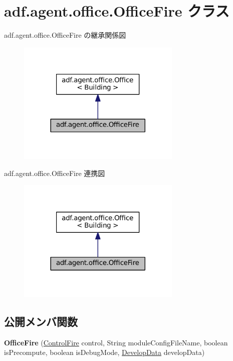 \hypertarget{classadf_1_1agent_1_1office_1_1OfficeFire}{}\section{adf.\+agent.\+office.\+Office\+Fire クラス}
\label{classadf_1_1agent_1_1office_1_1OfficeFire}


adf.\+agent.\+office.\+Office\+Fire の継承関係図
\nopagebreak
\begin{figure}[H]
\begin{center}
\leavevmode
\includegraphics[width=221pt]{classadf_1_1agent_1_1office_1_1OfficeFire__inherit__graph}
\end{center}
\end{figure}


adf.\+agent.\+office.\+Office\+Fire 連携図
\nopagebreak
\begin{figure}[H]
\begin{center}
\leavevmode
\includegraphics[width=221pt]{classadf_1_1agent_1_1office_1_1OfficeFire__coll__graph}
\end{center}
\end{figure}
\subsection*{公開メンバ関数}
\begin{DoxyCompactItemize}
\item 
\hypertarget{classadf_1_1agent_1_1office_1_1OfficeFire_a7123f1a425954a8027bb91bf59b97dae}{}\label{classadf_1_1agent_1_1office_1_1OfficeFire_a7123f1a425954a8027bb91bf59b97dae} 
{\bfseries Office\+Fire} (\hyperlink{classadf_1_1component_1_1control_1_1ControlFire}{Control\+Fire} control, String module\+Config\+File\+Name, boolean is\+Precompute, boolean is\+Debug\+Mode, \hyperlink{classadf_1_1agent_1_1develop_1_1DevelopData}{Develop\+Data} develop\+Data)
\end{DoxyCompactItemize}
